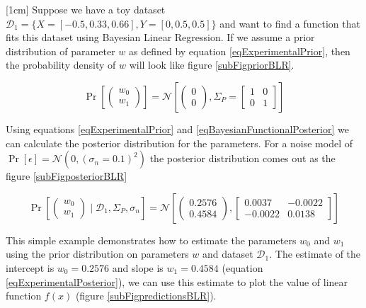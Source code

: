\begin{mdframed}[hidealllines=true,backgroundcolor=lightgray!20]
[1cm]
Suppose we have a toy dataset $\mathcal{D}_{1} = \{X = [-0.5, 0.33, 0.66], Y = [0, 0.5, 0.5]\}$ and want to find a function that fits this dataset using Bayesian Linear Regression. If we assume a prior distribution of parameter $w$ as defined by equation \ref{eqExperimentalPrior}, then the probability density of $w$ will look like figure \ref{subFigpriorBLR}.

\begin{equation}\label{eqExperimentalPrior}
\Pr \left [\begin{pmatrix}
w_{0}\\ 
w_{1}
\end{pmatrix} \right ] = \mathcal{N}\left [ \begin{pmatrix}
0\\ 
0
\end{pmatrix}, \Sigma_{P} = \begin{bmatrix}
1 & 0\\ 
0 & 1
\end{bmatrix} \right ]
\end{equation}

Using equations \ref{eqExperimentalPrior} and \ref{eqBayesianFunctionalPosterior} we can calculate the posterior distribution for the parameters. For a noise model of $\Pr[\epsilon] = \mathcal{N}(0, (\sigma_{n}=0.1)^2)$ the posterior distribution comes out as the figure \ref{subFigposteriorBLR}

\begin{equation}\label{eqExperimentalPosterior}
\Pr \left [\begin{pmatrix}
w_{0}\\ 
w_{1}
\end{pmatrix} \mid \mathcal{D}_{1}, \Sigma_{P}, \sigma_{n} \right ] = \mathcal{N}\left [ \begin{pmatrix}
0.2576\\ 
0.4584
\end{pmatrix}, \begin{bmatrix}
0.0037 & -0.0022\\ 
-0.0022 & 0.0138
\end{bmatrix} \right ]
\end{equation}

This simple example demonstrates how to estimate the parameters $w_{0}$ and $w_{1}$ using the prior distribution on parameters $w$ and dataset $\mathcal{D}_{1}$. The estimate of the intercept is $w_{0} = 0.2576$ and slope is $w_{1} = 0.4584$ (equation \ref{eqExperimentalPosterior}), we can use this estimate to plot the value of linear function $f(x)$ (figure \ref{subFigpredictionsBLR}). 
\end{mdframed}

